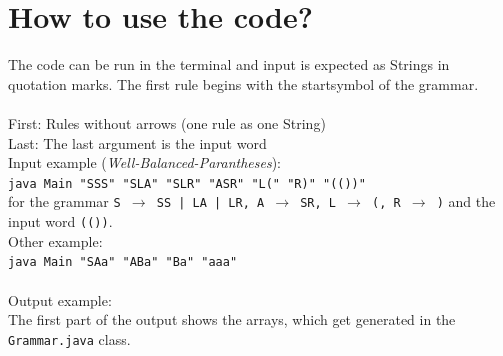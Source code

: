 \documentclass[a4paper, 11pt]{article}
\newcommand{\dq}{"}
\begin{document}
{}
\printbibliography




\newpage

\appendix

\section{How to use the code?}
\label{howtousethecode}

The code can be run in the terminal and input is expected as Strings in quotation marks. The first rule begins with the startsymbol of the grammar. \\ \\
First: Rules without arrows (one rule as one String) \\
Last: The last argument is the input word
\\ 
Input example (\textit{Well-Balanced-Parantheses}):\\
  \texttt{java Main \dq SSS\dq \ \dq SLA\dq \ \dq SLR\dq \ \dq ASR\dq \ \dq L(\dq \ \dq R)\dq\  \dq (())\dq} \\
  for the grammar \texttt{S $\rightarrow$ SS | LA | LR, A $\rightarrow$ SR, L $\rightarrow$ (, R $\rightarrow$ )} and the input word \texttt{(())}. \\
Other example: \\
 \texttt{java Main \dq SAa\dq \ \dq ABa\dq \ \dq Ba\dq \ \dq aaa\dq } 
\\ 
\\
Output example: \\
The first part of the output shows the arrays, which get generated in the \texttt{Grammar.java} class.  \\ \\
\end{document}
